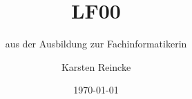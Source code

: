 \documentclass[]{beamer}
\title{LF00}
\subtitle{aus der Ausbildung zur Fachinformatikerin}
\institute{GS-LDK}
\author{Karsten Reincke}
\date{\today}
\def\cfgGl{../../cfg.gl/}
\begin{document}
\begin{frame}
  \titlepage
\end{frame}





\end{document}

